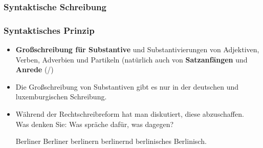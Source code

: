 \subsubsection{Syntaktische Schreibung}


\begin{frame}
\frametitle{Syntaktisches Prinzip}

\begin{itemize}
	\item \textbf{Großschreibung für Substantive} und Substantivierungen von Adjektiven, Verben, Adverbien und Partikeln (natürlich auch von \textbf{Satzanfängen} und \textbf{Anrede} (/)
	
	\item Die Großschreibung von Substantiven gibt es nur in der deutschen und luxemburgischen Schreibung.
	
	\item Während der Rechtschreibreform hat man diskutiert, diese abzuschaffen.\\
	Was denken Sie: Was spräche dafür, was dagegen?

\pause 
	
	\ea Berliner Berliner berlinern berlinernd berlinisches Berlinisch.
	\z 
\end{itemize}

\end{frame}


